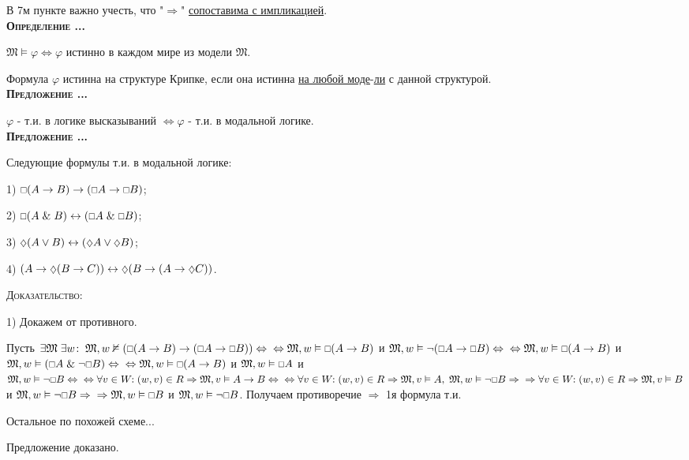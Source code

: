 \documentclass[18pt, a4paper]{extarticle}
\newcounter{par}
\newcounter{spar}
\newcounter{zap}
\newcommand{\opr}{\textbf{\textsc{Определение \thepar.\if\thespar1\thespar.\fi\thezap.\;}}\stepcounter{zap}}
\newcommand{\predl}{\textbf{\textsc{Предложение \thepar.\if\thespar1\thespar.\fi\thezap.\;}}\stepcounter{zap}}
\newcommand{\mM}{\mathfrak{M}}
\newcommand{\dok}{\textsc{Доказательство:}}
\newcommand{\ampersand}{\;\&\;}
\newcommand{\vp}{\varphi}
\newcommand{\vD}{\vDash}
\newcommand{\may}{\scalebox{0.8}{$\diamondsuit$}}
\newcommand{\need}{\scalebox{0.75}{$\Box$}}
\begin{document}
В 7м пункте важно учесть, что "$\Rightarrow$"{} \underline{сопоставима с импликацией}.\\

\opr 

$\mM\vD\vp\Leftrightarrow\vp$ истинно в каждом мире из модели $\mM$.

Формула $\vp$ истинна на структуре Крипке, если она истинна \underline{на любой моде}-\underline{ли} с данной структурой.\\

\predl 

$\vp$ - т.и. в логике высказываний $\Leftrightarrow\vp$ - т.и. в модальной логике.\\ 

\predl 

Следующие формулы т.и. в модальной логике:

1) $\need(A\to B)\to(\need A\to\need B)$;

2) $\need(A\ampersand B)\leftrightarrow(\need A\ampersand\need B)$;

3) $\may(A\vee B)\leftrightarrow(\may A\vee\may B)$;

4) $(A\to\may(B\to C))\leftrightarrow\may(B\to(A\to\may C))$.

\dok

1) Докажем от противного. 

Пусть $\exists\mM\;\exists w\!:\;\mM,w\nvDash(\need(A\to B)\to(\need A\to\need B))\Leftrightarrow\newline\Leftrightarrow\mM,w\vD\need(A\to B)$ и $\mM,w\vD\lnot(\need A\to\need B)\Leftrightarrow\newline\Leftrightarrow\mM,w\vD\need(A\to B)$ и $\mM,w\vD(\need A\ampersand\lnot\need B)\Leftrightarrow\newline\Leftrightarrow\mM,w\vD\need(A\to B)$ и $\mM,w\vD\need A$ и $\mM,w\vD\lnot\need B\Leftrightarrow\newline\Leftrightarrow\forall v\in W\!\!:(w,v)\in R\Rightarrow\mM,v\vD A\to B\Leftrightarrow\newline\Leftrightarrow\forall v\in W\!\!:(w,v)\in R\Rightarrow\mM,v\vD A,\;\mM,w\vD\lnot\need B\Rightarrow\newline\Rightarrow\forall v\in W\!\!:(w,v)\in R\Rightarrow\mM,v\vD B$ и $\mM,w\vD\lnot\need B\Rightarrow\newline\Rightarrow\mM,w\vD\need B$ и $\mM,w\vD\lnot\need B$. Получаем противоречие $\Rightarrow$ 1я формула т.и.

Остальное по похожей схеме...

Предложение доказано.\\
\end{document}
